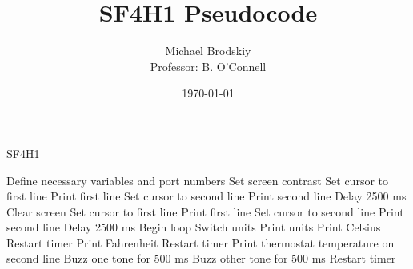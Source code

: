 


\title{SF4H1 Pseudocode}
\date{\today}
\author{Michael Brodskiy\\ \small Professor: B. O'Connell}



\maketitle

    \begin{algorithm}
      \caption{SF4H1}\label{SF4H1}
      \begin{algorithmic}[1]
        \State Define necessary variables and port numbers
        \State Set screen contrast
        \State Set cursor to first line
        \State Print first line
        \State Set cursor to second line
        \State Print second line
        \State Delay 2500 ms
        \State Clear screen
        \State Set cursor to first line
        \State Print first line
        \State Set cursor to second line
        \State Print second line
        \State Delay 2500 ms
        \State Begin loop
            \State Switch units
            \State Print units
        \EndIf
            \State Print Celsius
            \State Restart timer
            \State Print Fahrenheit
            \State Restart timer
        \EndIf
        \State Print thermostat temperature on second line
            \State Buzz one tone for 500 ms
            \State Buzz other tone for 500 ms
            \State Restart timer
        \EndIf
        \EndProcedure
      \end{algorithmic}
    \end{algorithm}



